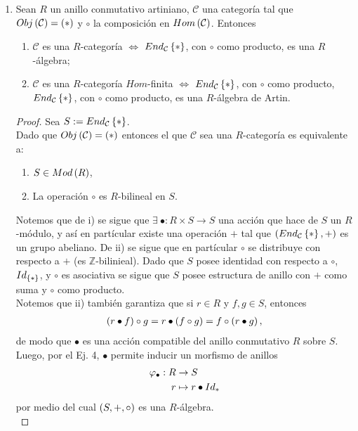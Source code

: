 \documentclass{article}
\begin{document}
\begin{enumerate}[label=\textbf{Ej \arabic*.}]
		\item Sean $R$ un anillo conmutativo artiniano, $\mathcal{C}$ una categoría tal que $Obj\left(\mathcal{C}\right)=\left(*\right)$ y $\circ$ la composición en $Hom\left(\mathcal{C}\right)$. Entonces
		\begin{enumerate}
			\item $\mathcal{C}$ es una $R$-categoría $\iff$ $End_{\mathcal{C}}\left\{*\right\}$, con $\circ$ como producto, es una $R$-álgebra;
			\item $\mathcal{C}$ es una $R$-categoría $Hom$-finita $\iff$ $End_{\mathcal{C}}\left\{*\right\}$, con $\circ$ como producto, $End_{\mathcal{C}}\left\{*\right\}$, con $\circ$ como producto, es una $R$-álgebra de Artin.
		\end{enumerate}
		\begin{proof}
			Sea $S:=End_{\mathcal{C}}\left\{*\right\}$.\\
			 Dado que $Obj\left(\mathcal{C}\right)=\left(*\right)$ entonces el que $\mathcal{C}$ sea una $R$-categoría es equivalente a:
			\begin{enumerate}[label=\roman*)]
				\item $S\in Mod\left(R\right)$,
				\item La operación $\circ$ es $R$-bilineal en $S$.
			\end{enumerate} 
			Notemos que de i) se sigue que $\exists\ \bullet:R\times S\to S$ una acción que hace de $S$ un $R$-módulo, y así en partícular existe una operación $+$ tal que $\left(End_{\mathcal{C}}\left\{*\right\},+\right)$ es un grupo abeliano. De ii) se sigue que en partícular $\circ$ se distribuye con respecto a $+$ (es $\mathbb{Z}$-bilinieal). Dado que $S$ posee identidad con respecto a $\circ$, $Id_{\left\{*\right\}}$, y $\circ$ es asociativa se sigue que $S$ posee estructura de anillo con $+$ como suma y $\circ$ como producto.\\
			Notemos que ii) también garantiza que si $r\in R$ y $f,g\in S$, entonces
			\begin{align*}
				\left(r\bullet f\right)\circ g=r\bullet\left(f\circ g\right)=f\circ\left(r\bullet g\right),
			\end{align*}
			de modo que $\bullet$ es una acción compatible del anillo conmutativo $R$ sobre $S$. Luego, por el Ej. 4, $\bullet$ permite inducir un morfismo de anillos 
			\begin{align*}
				\varphi_\bullet: R &\rightarrow S\\ r &\mapsto r\bullet Id_{*}
			\end{align*}
			por medio del cual $\left(S,+,\circ\right)$ es una $R$-álgebra.\\

\end{proof}
\end{enumerate}
\end{document}
